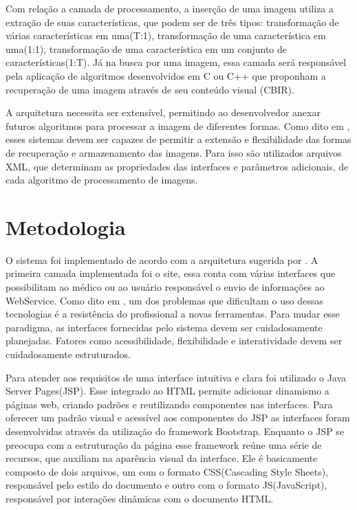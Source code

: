 Com relação a camada de processamento, a inserção de uma imagem utiliza a extração de suas características, que podem ser de três tipos: transformação de várias características em uma(T:1), transformação de uma característica em uma(1:1), transformação de uma característica em um conjunto de características(1:T)\cite{REF10}.
Já na busca por uma imagem, essa camada será responsável pela aplicação de algoritmos desenvolvidos em C ou C++ que proponham a recuperação de uma imagem através de seu conteúdo visual (CBIR).

A arquitetura necessita ser extensível, permitindo ao desenvolvedor anexar futuros algoritmos para processar a imagem de diferentes formas.
Como dito em \cite{REF18}, esses sistemas devem ser capazes de permitir a extensão e flexibilidade das formas de recuperação e armazenamento das imagens.
Para isso são utilizados arquivos XML, que determinam as propriedades das interfaces e parâmetros adicionais, de cada algoritmo de processamento de imagens.

\section{\esp Metodologia}


O sistema foi implementado de acordo com a arquitetura sugerida por \cite{REF10}.
A primeira camada implementada foi o site, essa conta com várias interfaces que possibilitam ao médico ou ao usuário responsável o envio de informações ao WebService.
Como dito em \cite{REF09}, um dos problemas que dificultam o uso dessas tecnologias é a resistência do profissional a novas ferramentas.
Para mudar esse paradigma, as interfaces fornecidas pelo sistema devem ser cuidadosamente planejadas.
Fatores como acessibilidade, flexibilidade e interatividade devem ser cuidadosamente estruturados.

Para atender aos requisitos de uma interface intuitiva e clara foi utilizado o Java Server Pages(JSP).
Esse integrado ao HTML permite adicionar dinamismo a páginas web, criando padrões e reutilizando componentes nas interfaces.
Para oferecer um padrão visual e acessível aos componentes do JSP as interfaces foram desenvolvidas através da utilização do framework Bootstrap.
Enquanto o JSP se preocupa com a estruturação da página esse framework reúne uma série de recursos, que auxiliam na aparência visual da interface.
Ele é basicamente composto de dois arquivos, um com o formato CSS(Cascading Style Sheets), responsável pelo estilo do documento e outro com o formato JS(JavaScript), responsável por interações dinâmicas com o documento HTML. 

